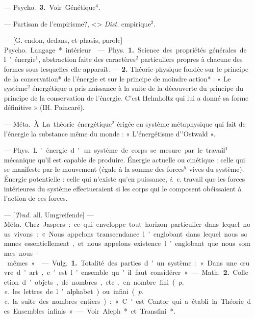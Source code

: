 \begin{itemize}[leftmargin=1cm, label=, itemsep=1pt]
— \si{Psycho.} {\bf 3.} Voir Génétique$^4$.

 — Partisan de l'empirisme?, <> {\it Dist.} empirique$^2$.

 — [G. endon, dedans, et
phasis, parole] — \si{Psycho.} Langage*
intérieur.

 — \si{Phys.} {\bf 1.} Science des
propriétés générales de l’énergie$^1$,
abstraction faite des caractères$^2$
particuliers propres à chacune des
formes sous lesquelles elle apparaît.
— {\bf 2.} Théorie physique fondée sur
le principe de la conservation* de
l'énergie et sur le principe de moindre
action* : « Le système$^2$ énergétique
a pris naissance à la suite de la
découverte du principe du principe
de la conservation de l'énergie. C’est
Helmholtz qui lui a donné sa forme
définitive » (IH. Poincaré).

 — \si{Méta.} À La théorie
énergétique$^2$ érigée en système métaphysique qui fait de l'énergie la
substance même du monde : « L’énergétisme d’'Ostwald ».

 — \si{Phys.} L'énergie d'un système de corps se mesure par le
travail$^1$ mécanique qu’il est capable
de produire. Énergie actuelle ou
cinétique : celle qui se manifeste par
le mouvement (égale à la somme
des forces$^5$ vives du système).
Énergie potentielle : celle qui n'existe
qu’en puissance, {\it i. e.} travail que les
forces intérieures du système effectueraient si les corps qui le composent obéissaient à l'action de ces
forces.

 — [{\it Trad.} all. Umgreifende] —
\si{Méta.} Chez Jaspers : ce qui enveloppe tout horizon particulier dans
lequel nous vivons : « Nous appelons
transcendance l’englobant dans lequel
nous sommes essentiellement, et
nous appelons existence l’englobant
que nous sommes nous-mêmes. »

 — \si{Vulg.} {\bf 1.} Totalité des
parties d'un système : « Dans une
œuvre d'art, c’est l’ensemble qu'il
faut considérer ». — \si{Math.} {\bf 2.} Collection d’objets, de nombres, etc., en
nombre fini ({\it p. e.} les lettres de l’alphabet) ou infini ({\it p. e.} la suite des
nombres entiers) : « C’est Cantor qui
a établi la Théorie des Ensembles
infinis ». — Voir Aleph* et Transfini*.


\end{itemize}
